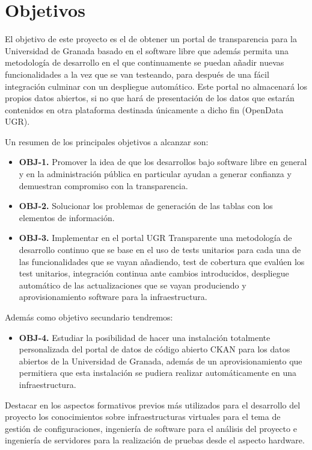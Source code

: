 \chapter{Objetivos}

El objetivo de este proyecto es el de obtener un portal de transparencia para la Universidad de Granada basado en el software libre que además permita una metodología de desarrollo en el que continuamente se puedan añadir nuevas funcionalidades a la vez que se van testeando, para después de una fácil integración culminar con un despliegue automático. Este portal no almacenará
los propios datos abiertos, si no que hará de presentación de los datos que estarán contenidos en otra plataforma destinada únicamente a dicho fin (OpenData UGR).

\bigskip
Un resumen de los principales objetivos a alcanzar son:

\begin{itemize}
  \item \textbf{OBJ-1.} Promover la idea de que los desarrollos bajo software libre en general y en la administración pública en particular ayudan a generar confianza y demuestran compromiso con la transparencia.
  \item \textbf{OBJ-2.} Solucionar los problemas de generación de las tablas con los elementos de información.
  \item \textbf{OBJ-3.} Implementar en el portal UGR Transparente una metodología de desarrollo continuo que se base en el uso de tests unitarios para cada una de las funcionalidades que se vayan añadiendo, test de cobertura que evalúen los test unitarios, integración continua ante cambios introducidos, despliegue automático de las actualizaciones que se vayan produciendo y aprovisionamiento software para la infraestructura.
\end{itemize}

Además como objetivo secundario tendremos:

\begin{itemize}
  \item \textbf{OBJ-4.} Estudiar la posibilidad de hacer una instalación totalmente personalizada del portal de datos de código abierto CKAN para los datos abiertos de la Universidad de Granada, además de un aprovisionamiento que permitiera que esta instalación se pudiera realizar automáticamente en una infraestructura.
\end{itemize}

\bigskip
Destacar en los aspectos formativos previos más utilizados para el desarrollo del proyecto los conocimientos sobre infraestructuras virtuales para el tema de gestión de configuraciones, ingeniería de software para el análisis del proyecto e ingeniería de servidores para la realización de pruebas desde el aspecto hardware.

